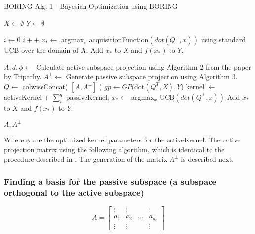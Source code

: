\begin{algorithm}[H]
\caption{BORING Alg. 1 - Bayesian Optimization using BORING}

\begin{algorithmic} 
\STATE $X \leftarrow \emptyset$
\STATE $Y \leftarrow \emptyset$

\STATE $i \leftarrow 0$
\STATE $i++$
\STATE $x_* \leftarrow $ argmax$_x$ acquisitionFunction$(dot(Q^{\bot}, x) )$ using standard UCB over the domain of $X$.
\STATE Add $x_*$ to $X$ and $ f(x_*)$ to $Y$.
\ENDWHILE

\STATE $A, d, \phi \leftarrow $ Calculate active subspace projection using Algorithm 2 from the paper by Tripathy.
\STATE $A^{\bot} \leftarrow $ Generate passive subspace projection using Algorithm 3.
\STATE $Q \leftarrow $ colwiseConcat( $[A, A^{\bot}]$ ) 
\STATE $gp \leftarrow GP( $dot$( Q^T, X), Y)$
\STATE kernel $\leftarrow$ activeKernel + $\sum_i^{q}$ passiveKernel$_i$ 
\STATE $x_* \leftarrow $ argmax$_x$ UCB$(dot(Q^{\bot}, x) )$
\STATE Add $x_*$ to $X$ and $ f(x_*)$ to $Y$.
\ENDWHILE

\RETURN $A, A^\bot$
\end{algorithmic}

\end{algorithm}

Where $\phi$ are the optimized kernel parameters for the activeKernel.
The active projection matrix using the following algorithm, which is identical to the procedure described in \citep{Tripathy}.
The generation of the matrix $ A^{\bot} $ is described next.

\subsubsection{Finding a basis for the passive subspace (a subspace orthogonal to the active subspace)}

\begin{equation}
A = 
\begin{bmatrix}
 \vdots & \vdots & & \vdots \\
 a_1 & a_2 & ... & a_{d_e} \\
 \vdots & \vdots & & \vdots
\end{bmatrix}
\label{eq:maximalEmbedding}
\end{equation}


